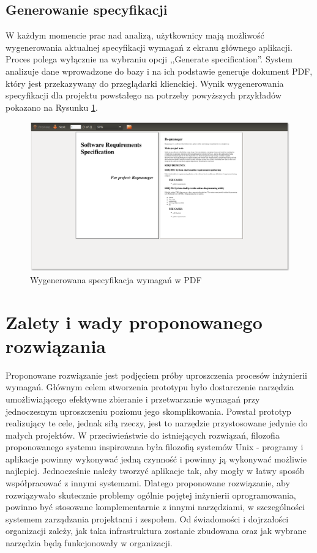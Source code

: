     \subsection{Generowanie specyfikacji}

      W każdym momencie prac nad analizą, użytkownicy mają możliwość wygenerowania aktualnej specyfikacji wymagań z ekranu głównego aplikacji. Proces polega wyłącznie na wybraniu opcji ,,Generate specification''. System analizuje dane wprowadzone do bazy i na ich podstawie generuje dokument PDF, który jest przekazywany do przeglądarki klienckiej. Wynik wygenerowania specyfikacji dla projektu powstałego na potrzeby powyższych przykładów pokazano na Rysunku \ref{fig:spec}.

      \begin{figure}[t]
        \centering
        \includegraphics[width=1.0\textwidth]{img/tut_9.png}
        \caption{Wygenerowana specyfikacja wymagań w PDF}
        \label{fig:spec}
      \end{figure}

  \newpage

  \section{Zalety i wady proponowanego rozwiązania}
    Proponowane rozwiązanie jest podjęciem próby uproszczenia procesów inżynierii wymagań. Głównym celem stworzenia prototypu było dostarczenie narzędzia umożliwiającego efektywne zbieranie i przetwarzanie wymagań przy jednoczesnym uproszczeniu poziomu jego skomplikowania. Powstał prototyp realizujący te cele, jednak siłą rzeczy, jest to narzędzie przystosowane jedynie do małych projektów. W przeciwieństwie do istniejących rozwiązań, filozofia proponowanego systemu inspirowana była filozofią systemów Unix - programy i aplikacje powinny wykonywać jedną czynność i powinny ją wykonywać możliwie najlepiej. Jednocześnie należy tworzyć aplikacje tak, aby mogły w łatwy sposób współpracować z innymi systemami. Dlatego proponowane rozwiązanie, aby rozwiązywało skutecznie problemy ogólnie pojętej inżynierii oprogramowania, powinno być stosowane komplementarnie z innymi narzędziami, w szczególności systemem zarządzania projektami i zespołem. Od świadomości i dojrzałości organizacji zależy, jak taka infrastruktura zostanie zbudowana oraz jak wybrane narzędzia będą funkcjonowały w organizacji.

